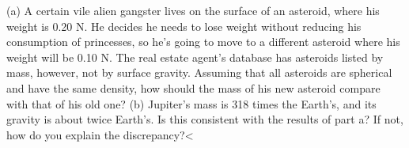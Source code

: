 (a) A certain vile alien gangster lives on the
surface of an asteroid, where his weight is 0.20 N. He
decides he needs to lose weight without reducing his
consumption of princesses, so he's going to move to a
different asteroid where his weight will be 0.10 N. The
real estate agent's database has asteroids listed by mass,
however, not by surface gravity. Assuming that all asteroids
are spherical and have the same density, how should the mass
of his new asteroid compare with that of his old one?\hwendpart
 (b)
Jupiter's mass is 318 times the Earth's, and its gravity is
about twice Earth's. Is this consistent with the results of
part a? If not, how do you explain the discrepancy?<%

